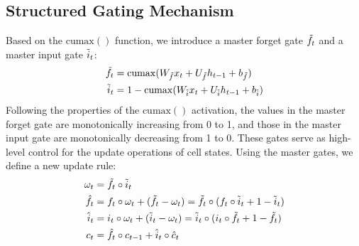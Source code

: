 \documentclass{article} \usepackage{iclr2019_conference,times}
\newcommand{\cumax}{\mathrm{cumax}}
\begin{document}
\subsection{Structured Gating Mechanism}
Based on the $\cumax()$ function, we introduce a master forget gate $\Tilde{f}_{t}$ and a master input gate $\Tilde{i}_{t}$:
\begin{align}
    \Tilde{f}_{t} &= \cumax (W_{\Tilde{f}}x_{t}+U_{\Tilde{f}}h_{t-1}+b_{\Tilde{f}}) \label{eq:masterforget} \\
    \Tilde{i}_{t} &= 1 - \cumax (W_{\Tilde{i}}x_{t}+U_{\Tilde{i}}h_{t-1}+b_{\Tilde{i}}) \label{eq:masterinput}
\end{align}
Following the properties of the $\cumax()$ activation, the values in the master forget gate are monotonically increasing from 0 to 1, and those in the master input gate are monotonically decreasing from 1 to 0.
These gates serve as high-level control for the update operations of cell states. Using the master gates, we define a new update rule:
\begin{align}
    \omega_t &= \Tilde{f}_t \circ \Tilde{i}_t \label{eq:overlap} \\
    \hat{f}_t &= f_t \circ \omega_t + (\Tilde{f}_t - \omega_t) = \Tilde{f}_t \circ (f_t \circ \Tilde{i}_t + 1 - \Tilde{i}_t) \label{eq:onforget} \\
    \hat{i}_t &= i_t \circ \omega_t + (\Tilde{i}_t - \omega_t) = \Tilde{i}_t \circ (i_t \circ \Tilde{f}_t + 1 - \Tilde{f}_t) \label{eq:oninput} \\
    c_{t} &= \hat{f}_{t}\circ c_{t-1} + \hat{i}_{t}\circ \hat{c}_{t} \label{eq:onupdate}
\end{align}
\end{document}

